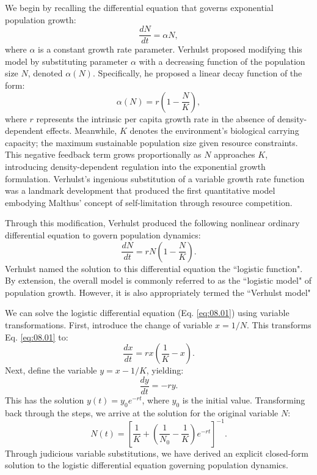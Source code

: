 We begin by recalling the differential equation that governs exponential population growth:
\begin{equation*}
\frac{dN}{dt} = \alpha N,
\end{equation*}
where $\alpha$ is a constant growth rate parameter. Verhulst proposed modifying this model by substituting parameter $\alpha$ with a decreasing function of the population size $N$, denoted $\alpha(N)$. Specifically, he proposed a linear decay function of the form:
\begin{equation*}
\alpha(N) = r\left(1 - \frac{N}{K}\right),
\end{equation*}
where $r$ represents the intrinsic per capita growth rate in the absence of density-dependent effects. Meanwhile, $K$ denotes the environment's biological carrying capacity; the maximum sustainable population size given resource constraints. This negative feedback term grows proportionally as $N$ approaches $K$, introducing density-dependent regulation into the exponential growth formulation. Verhulst's ingenious substitution of a variable growth rate function was a landmark development that produced the first quantitative model embodying Malthus' concept of self-limitation through resource competition.

Through this modification, Verhulst produced the following nonlinear ordinary differential equation to govern population dynamics:
\begin{equation}
\frac{dN}{dt} = rN\left(1 - \frac{N}{K}\right).
\label{eq:08.01}
\end{equation}
Verhulst named the solution to this differential equation the ``logistic function". By extension, the overall model is commonly referred to as the ``logistic model" of population growth. However, it is also appropriately termed the ``Verhulst model"

We can solve the logistic differential equation (Eq. \ref{eq:08.01}) using variable transformations. First, introduce the change of variable $x = 1/N$. This transforms Eq. \eqref{eq:08.01} to:
\begin{equation*}
\frac{dx}{dt} = rx\left(\frac{1}{K} - x\right).
\end{equation*}
Next, define the variable $y = x - 1/K$, yielding:
\begin{equation*}
\frac{dy}{dt} = -ry.
\end{equation*}
This has the solution $y(t) = y_0e^{-rt}$, where $y_0$ is the initial value. Transforming back through the steps, we arrive at the solution for the original variable $N$:
\begin{equation}
N(t) = \left[\frac{1}{K} + \left(\frac{1}{N_0} - \frac{1}{K}\right)e^{-rt}\right]^{-1}.
\label{eq:08.02}
\end{equation}
Through judicious variable substitutions, we have derived an explicit closed-form solution to the logistic differential equation governing population dynamics. 

